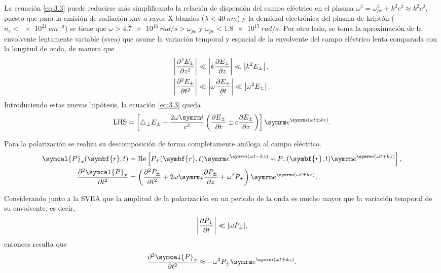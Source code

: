 La ecuación \eqref{eq:3.3} puede reducirse más simplificando la relación de dispersión del campo eléctrico en el plasma $\omega^{2} = \omega^{2}_{pe} + k^{2}c^{2}\approx k^{2}c^{2}$, puesto que para la emisión de radiación \acrshort{xuv} o rayos X blandos ($\lambda<\qty{40}{nm}$) y la densidad electrónica del plasma de kriptón ($n_e<\qty{e21}{cm^{-3}}$) se tiene 
que $\omega>\qty{4,7e16}{rad/s}>\omega_{pe}$ y $\omega_{pe}<\qty{1,8e15}{rad/s}$. Por otro lado, se toma la aproximación de la envolvente lentamente variable (\acrshort{svea}) que asume la variación temporal y espacial de la envolvente del campo eléctrico lenta comparada con la longitud de onda, de manera que
\begin{align}
  \left|\frac{\partial^{2}E_{\pm }}{\partial{z}^{2}}\right| &\ll \left|k \frac{\partial E_{\pm }}{\partial z}\right| \ll \left|k^{2}E_{\pm }\right|,\\
  \left|\frac{\partial^{2}E_{\pm }}{\partial{t}^{2}}\right| &\ll \left|\omega \frac{\partial E_{\pm }}{\partial t}\right| \ll \left|\omega^{2}E_{\pm }\right|.
\end{align}
\noindent
Introduciendo estas nuevas hipótesis, la ecuación \eqref{eq:3.3} queda
\begin{equation}
  \mathrm{LHS} =
  \left[\laplacian_{\perp}E_{\pm } - \frac{2 \omega \iu }{c^{2}} \left(\pdv{E_{\pm }}{t} \pm c \pdv{E_{\pm }}{z}\right)\right]\eu^{\iu (\omega t \pm kz)}.
\end{equation}

Para la polarización se realiza su descomposición de forma completamente análoga al campo eléctrico.
\begin{align}
    \symcal{P}_{x}(\symbf{r},t) 
    &=
    \RE \left[P_{+}(\symbf{r},t)\eu^{\iu (\omega t -kz)} + P_{-}(\symbf{r},t)\eu^{\iu (\omega t + kz)}\right], \\
    \pdvN{\symcal{P}_{x}}{t}{2}
    &=
    \left(\pdvN{P_{\pm }}{t}{2} + 2 \omega \iu \pdv{P_{\pm }}{z} + \omega^{2}P_{\pm }\right)\eu^{\iu (\omega t \pm kz)}.
\end{align}

Considerando junto a la SVEA que la amplitud de la polarización en un periodo de la onda es mucho mayor que la variación temporal de su envolvente, es decir,
\begin{equation}
  \left|\frac{\partial P_{\pm }}{\partial t}\right| \ll |\omega P_{\pm }|,
\end{equation}
\noindent
entonces resulta que
\begin{equation}\label{eq:3.4}
  \pdvN{\symcal{P}_{x}}{t}{2} \approx -\omega^{2}P_{\pm }\eu^{\iu (\omega t \pm kz)}.
\end{equation}

